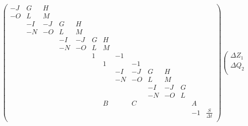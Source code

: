 \begin{equation}
    \left(
         \begin{array}{cccccccccccccc}
          \scriptscriptstyle -J & \scriptscriptstyle G & \scriptscriptstyle H & & & & & & & & & & &\\
           \scriptscriptstyle -O & \scriptscriptstyle L & \scriptscriptstyle M & & & & & & & & &  & &\\
              & \scriptscriptstyle -I & \scriptscriptstyle -J & \scriptscriptstyle G & \scriptscriptstyle H & & & & & & &  & &\\
              & \scriptscriptstyle -N & \scriptscriptstyle -O & \scriptscriptstyle L & \scriptscriptstyle M & & & &  & & &  & &\\
              & & & \scriptscriptstyle -I & \scriptscriptstyle -J & \scriptscriptstyle G & \scriptscriptstyle H & & & & &  & &\\
              & & & \scriptscriptstyle -N & \scriptscriptstyle -O & \scriptscriptstyle L & \scriptscriptstyle M & & & & &  & &\\
              & & & & & \scriptscriptstyle 1 & & \scriptscriptstyle -1 & & & &  & &\\
              & & & & & & \scriptscriptstyle 1 & & \scriptscriptstyle -1 & & &  & &\\
              & & & & & & & \scriptscriptstyle -I & \scriptscriptstyle -J & \scriptscriptstyle G & \scriptscriptstyle H &  & &\\
              & & & & & & & \scriptscriptstyle -N & \scriptscriptstyle -O & \scriptscriptstyle L & \scriptscriptstyle M &  & &\\
              & & & & & & & & & \scriptscriptstyle -I & \scriptscriptstyle -J & \scriptscriptstyle G  & &\\
              & & & & & & & & & \scriptscriptstyle -N & \scriptscriptstyle -O & \scriptscriptstyle L  & &\\
              & & & & & & \scriptscriptstyle B & & \scriptscriptstyle C & & & & \scriptscriptstyle A &\\
              & & & & & & & & & & & &  \scriptscriptstyle -1 & \scriptscriptstyle \frac{S}{\Delta t}\\
         \end{array}
    \right)
    \left(
            \begin{array}{c}
               \scriptscriptstyle \Delta Z_1\\
               \scriptscriptstyle \Delta Q_2\\

\end{array}
\end{equation}
